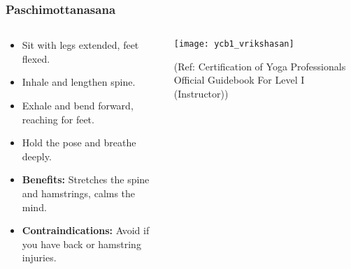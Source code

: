 \begin{frame}[fragile]\frametitle{Paschimottanasana}
\begin{columns}
    \begin{column}[T]{0.5\linewidth}
      \begin{itemize}
        \item Sit with legs extended, feet flexed.
        \item Inhale and lengthen spine.
        \item Exhale and bend forward, reaching for feet.
        \item Hold the pose and breathe deeply.
        \item \textbf{Benefits:} Stretches the spine and hamstrings, calms the mind.
        \item \textbf{Contraindications:} Avoid if you have back or hamstring injuries.
      \end{itemize}
    \end{column}
    \begin{column}[T]{0.5\linewidth}
        \begin{center}
        \begin{center}
		        \texttt{[image: ycb1\_vrikshasan]}
				
				{\tiny (Ref: Certification  of Yoga Professionals Official Guidebook For Level I (Instructor))}	        
		\end{center}   
        \end{center}    
    \end{column}
  \end{columns}
\end{frame}

